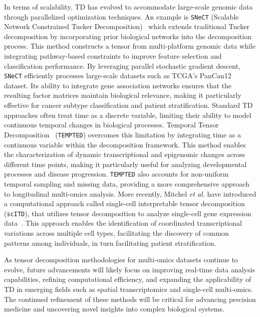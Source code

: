 In terms of scalability, TD has evolved to accommodate large-scale genomic data through parallelized optimization techniques. An example is \texttt{SNeCT} (Scalable Network Constrained Tucker Decomposition)~\cite{Choi2020SNeCT} which extends traditional Tucker decomposition by incorporating prior biological networks into the decomposition process. This method constructs a tensor from multi-platform genomic data while integrating pathway-based constraints to improve feature selection and classification performance. By leveraging parallel stochastic gradient descent, \texttt{SNeCT} efficiently processes large-scale datasets such as TCGA’s PanCan12 dataset. Its ability to integrate gene association networks ensures that the resulting factor matrices maintain biological relevance, making it particularly effective for cancer subtype classification and patient stratification. Standard TD approaches often treat time as a discrete variable, limiting their ability to model continuous temporal changes in biological processes. Temporal Tensor Decomposition~\cite{Shi2024TEMPTED} (\texttt{TEMPTED}) overcomes this limitation by integrating time as a continuous variable within the decomposition framework. This method enables the characterization of dynamic transcriptional and epigenomic changes across different time points, making it particularly useful for analyzing developmental processes and disease progression. \texttt{TEMPTED} also accounts for non-uniform temporal sampling and missing data, providing a more comprehensive approach to longitudinal multi-omics analysis. More recently, Mitchel \textit{et al.} have introduced a computational approach called single-cell interpretable tensor decomposition (\texttt{scITD}), that utilizes tensor decomposition to analyze single-cell gene expression data~\cite{mitchel2024coordinated}. This approach enables the identification of coordinated transcriptional variations across multiple cell types, facilitating the discovery of common patterns among individuals, in turn facilitating patient stratification.

As tensor decomposition methodologies for multi-omics datasets continue to evolve, future advancements will likely focus on improving real-time data analysis capabilities, refining computational efficiency, and expanding the applicability of TD in emerging fields such as spatial transcriptomics and single-cell multi-omics. The continued refinement of these methods will be critical for advancing precision medicine and uncovering novel insights into complex biological systems.



